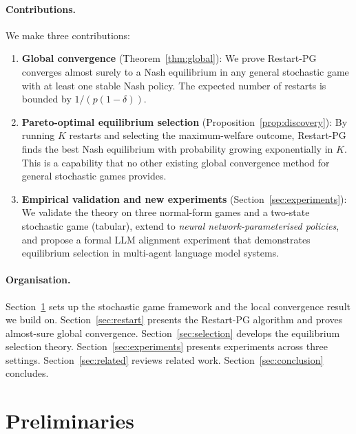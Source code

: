 \documentclass{article}
\begin{document}
\paragraph{Contributions.} We make three contributions:
\begin{enumerate}
\item \textbf{Global convergence} (Theorem~\ref{thm:global}): We prove
  Restart-PG converges almost surely to a Nash equilibrium in any
  general stochastic game with at least one stable Nash policy.
  The expected number of restarts is bounded by $1/(p(1-\delta))$.

\item \textbf{Pareto-optimal equilibrium selection}
  (Proposition~\ref{prop:discovery}): By running $K$ restarts and
  selecting the maximum-welfare outcome, Restart-PG finds the best Nash
  equilibrium with probability growing exponentially in $K$. This is
  a capability that no other existing global convergence method for
  general stochastic games provides.

\item \textbf{Empirical validation and new experiments}
  (Section~\ref{sec:experiments}): We validate the theory on three
  normal-form games and a two-state stochastic game (tabular),
  extend to \emph{neural network-parameterised policies}, and propose
  a formal LLM alignment experiment that demonstrates equilibrium
  selection in multi-agent language model systems.
\end{enumerate}

\paragraph{Organisation.} Section~\ref{sec:prelim} sets up the
stochastic game framework and the local convergence result we build
on. Section~\ref{sec:restart} presents the Restart-PG algorithm and
proves almost-sure global convergence. Section~\ref{sec:selection}
develops the equilibrium selection theory. Section~\ref{sec:experiments}
presents experiments across three settings. Section~\ref{sec:related}
reviews related work. Section~\ref{sec:conclusion} concludes.

\section{Preliminaries}
\label{sec:prelim}
\end{document}
